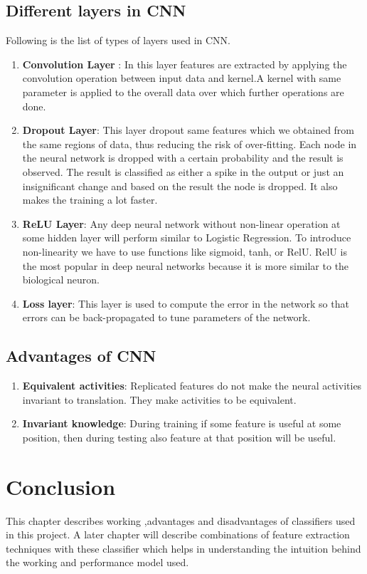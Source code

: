 \documentclass[11pt]{report}
\begin{document}
\subsection{Different layers in CNN}
Following is the list of types of layers used in CNN.
\begin{enumerate}
\item \textbf{Convolution Layer }: In this layer features are extracted by applying the convolution operation between input data and kernel.A kernel with same parameter is applied to the overall data over which further operations are done.
\item \textbf{Dropout  Layer}: This layer dropout same features which we obtained from the same regions of data, thus reducing the risk of over-fitting. Each node in the neural network is dropped with a certain probability and the result is observed. The result is classified as either a spike in the output or just an insignificant change and based on the result the node is dropped. It also makes the training a lot faster.
\item \textbf{ReLU Layer}: Any deep neural network without non-linear operation at some hidden layer will perform similar to Logistic Regression. To introduce non-linearity we have to use functions like sigmoid, tanh, or RelU. RelU is the most popular in deep neural networks because it is more similar to the biological neuron.  
\item \textbf{Loss layer}: This layer is used to compute the error in the network so that errors can be back-propagated to tune parameters of the network.
\end{enumerate}

\subsection{Advantages of CNN}
\begin{enumerate}
\item \textbf{Equivalent activities}: Replicated features do not make the neural activities invariant to translation. They make activities to be equivalent.

\item \textbf{Invariant knowledge}: During training if some feature is useful at some position, then during testing also feature at that position will be useful.
\end{enumerate}

\section{Conclusion}
This chapter describes working ,advantages and disadvantages of classifiers used in this project. A later chapter will describe combinations of feature extraction techniques with these classifier which helps in understanding the intuition behind the working and performance model used. 
\end{document}
